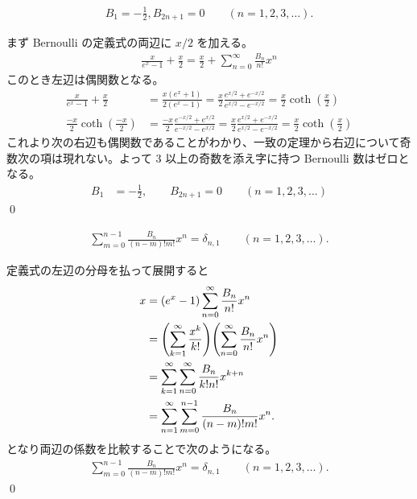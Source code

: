 \documentclass[uplatex,dvipdfmx,a4paper,11pt]{jlreq}
\makeatletter
\theoremstyle{definition}
\renewenvironment{proof}[1][\proofname]{\par
  \normalfont
  \topsep6\p@\@plus6\p@ \trivlist
  \item[\hskip\labelsep{\bfseries #1}\@addpunct{\bfseries}]\ignorespaces\quad\par
}{%
  \qed\endtrivlist\@endpefalse
}
\renewcommand\proofname{証明}
\makeatother
\begin{document}
\begin{proposition}
  \begin{align}
    B_1 = -\frac{1}{2}, B_{2n+1} = 0 \qquad (n = 1,2,3,\ldots).
  \end{align}
\end{proposition}
\begin{proof}
  まず Bernoulli の定義式の両辺に $x/2$ を加える。
  \begin{align}
    \frac{x}{e^x - 1} + \frac{x}{2} = \frac{x}{2} + \sum_{n=0}^{\infty}\frac{B_n}{n!}x^n
  \end{align}
  このとき左辺は偶関数となる。
  \begin{align}
    \frac{x}{e^x - 1} + \frac{x}{2} & = \frac{x(e^x + 1)}{2(e^x - 1)} = \frac{x}{2}\frac{e^{x/2} + e^{-x/2}}{e^{x/2} - e^{-x/2}} = \frac{x}{2}\coth(\frac{x}{2})                             \\
    \frac{-x}{2}\coth(\frac{-x}{2}) & = \frac{-x}{2}\frac{e^{-x/2} + e^{x/2}}{e^{-x/2} - e^{x/2}} = \frac{x}{2}\frac{e^{x/2} + e^{-x/2}}{e^{x/2} - e^{-x/2}} = \frac{x}{2}\coth(\frac{x}{2})
  \end{align}
  これより次の右辺も偶関数であることがわかり、一致の定理から右辺について奇数次の項は現れない。よって 3 以上の奇数を添え字に持つ Bernoulli 数はゼロとなる。
  \begin{align}
    B_1 & = -\frac{1}{2}, \qquad B_{2n+1} = 0 \qquad (n = 1,2,3,\ldots)
  \end{align}
\end{proof}
\begin{theorem}
  \begin{align}
    \sum_{m=0}^{n-1}\frac{B_n}{(n - m)!m!}x^n = \delta_{n,1} \qquad (n = 1,2,3,\ldots).
  \end{align}
\end{theorem}
\begin{proof}
  定義式の左辺の分母を払って展開すると
  \begin{align}
    x & = (e^x - 1)\sum_{n=0}^{\infty}\frac{B_n}{n!}x^n                                     \\
      & = \qty(\sum_{k=1}^{\infty}\frac{x^k}{k!})\qty(\sum_{n=0}^{\infty}\frac{B_n}{n!}x^n) \\
      & = \sum_{k=1}^{\infty}\sum_{n=0}^{\infty}\frac{B_n}{k!n!}x^{k+n}                     \\
      & = \sum_{n=1}^{\infty}\sum_{m=0}^{n-1}\frac{B_n}{(n - m)!m!}x^n.
  \end{align}
  となり両辺の係数を比較することで次のようになる。
  \begin{align}
    \sum_{m=0}^{n-1}\frac{B_n}{(n - m)!m!}x^n = \delta_{n,1} \qquad (n = 1,2,3,\ldots).
  \end{align}
\end{proof}
\end{document}
